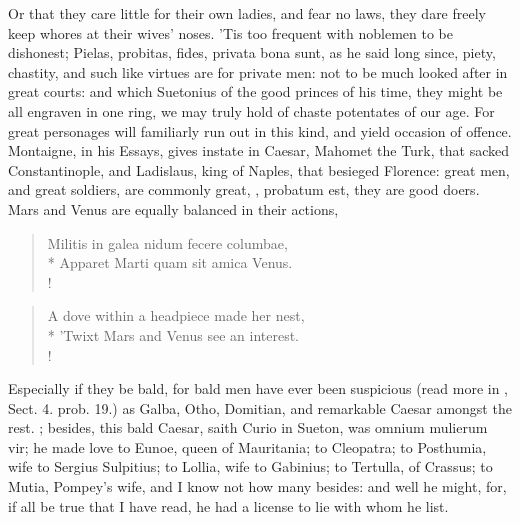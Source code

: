 Or that they care little for their own ladies, and fear no laws, they
dare freely keep whores at their wives' noses. 'Tis too frequent with
noblemen to be dishonest; Pielas, probitas, fides, privata bona sunt,
as he said long since, piety, chastity, and such like virtues are
for private men: not to be much looked after in great courts: and which
Suetonius of the good princes of his time, they might be all engraven
in one ring, we may truly hold of chaste potentates of our age. For
great personages will familiarly run out in this kind, and yield
occasion of offence.  Montaigne, in his Essays, gives instate in
Caesar, Mahomet the Turk, that sacked Constantinople, and Ladislaus,
king of Naples, that besieged Florence: great men, and great soldiers,
are commonly great, \etc{}, probatum est, they are good doers. Mars and
Venus are equally balanced in their actions,
%
\begin{latin}%
\begin{verse}%
Militis in galea nidum fecere columbae,\\*
Apparet Marti quam sit amica Venus.\\!
\end{verse}%
\end{latin}%
\translationrule%
\begin{verse}%
A dove within a headpiece made her nest,\\*
'Twixt Mars and Venus see an interest.\\!
\end{verse}%
%

Especially if they be bald, for bald men have ever been suspicious
(read more in \Aristotle, Sect. 4. prob. 19.) as Galba, Otho, Domitian,
and remarkable Caesar amongst the rest. ; besides, this bald Caesar, saith Curio in
Sueton, was omnium mulierum vir; he made love to Eunoe, queen of
Mauritania; to Cleopatra; to Posthumia, wife to Sergius Sulpitius; to
Lollia, wife to Gabinius; to Tertulla, of Crassus; to Mutia, Pompey's
wife, and I know not how many besides: and well he might, for, if all
be true that I have read, he had a license to lie with whom he list.

